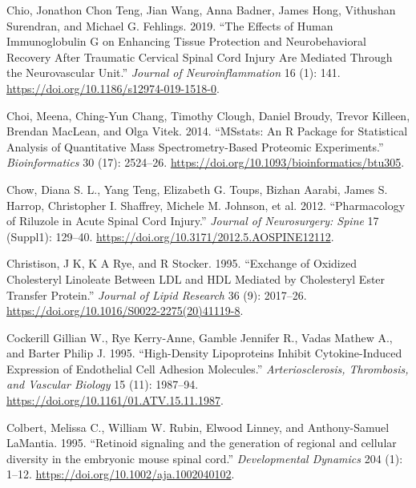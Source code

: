 \documentclass[9pt,lineno]{elife}
\newlength{\cslhangindent}
\newlength{\cslentryspacingunit} %
\newenvironment{CSLReferences}[2] %
 {%
  \setlength{\parindent}{0pt}
  \ifodd #1
  \let\oldpar\par
  \def\par{\hangindent=\cslhangindent\oldpar}
  \fi
  \setlength{\parskip}{#2\cslentryspacingunit}
 }%
 {}
\begin{document}
\begin{CSLReferences}{1}{0}
\leavevmode{}%
Chio, Jonathon Chon Teng, Jian Wang, Anna Badner, James Hong, Vithushan Surendran, and Michael G. Fehlings. 2019. {``The Effects of Human Immunoglobulin {G} on Enhancing Tissue Protection and Neurobehavioral Recovery After Traumatic Cervical Spinal Cord Injury Are Mediated Through the Neurovascular Unit.''} \emph{Journal of Neuroinflammation} 16 (1): 141. \url{https://doi.org/10.1186/s12974-019-1518-0}.

\leavevmode{}%
Choi, Meena, Ching-Yun Chang, Timothy Clough, Daniel Broudy, Trevor Killeen, Brendan MacLean, and Olga Vitek. 2014. {``{MSstats}: An {R} Package for Statistical Analysis of Quantitative Mass Spectrometry-Based Proteomic Experiments.''} \emph{Bioinformatics} 30 (17): 2524--26. \url{https://doi.org/10.1093/bioinformatics/btu305}.

\leavevmode{}%
Chow, Diana S. L., Yang Teng, Elizabeth G. Toups, Bizhan Aarabi, James S. Harrop, Christopher I. Shaffrey, Michele M. Johnson, et al. 2012. {``Pharmacology of Riluzole in Acute Spinal Cord Injury.''} \emph{Journal of Neurosurgery: Spine} 17 (Suppl1): 129--40. \url{https://doi.org/10.3171/2012.5.AOSPINE12112}.

\leavevmode{}%
Christison, J K, K A Rye, and R Stocker. 1995. {``Exchange of Oxidized Cholesteryl Linoleate Between {LDL} and {HDL} Mediated by Cholesteryl Ester Transfer Protein.''} \emph{Journal of Lipid Research} 36 (9): 2017--26. \url{https://doi.org/10.1016/S0022-2275(20)41119-8}.

\leavevmode{}%
Cockerill Gillian W., Rye Kerry-Anne, Gamble Jennifer R., Vadas Mathew A., and Barter Philip J. 1995. {``High-{Density Lipoproteins Inhibit Cytokine-Induced Expression} of {Endothelial Cell Adhesion Molecules}.''} \emph{Arteriosclerosis, Thrombosis, and Vascular Biology} 15 (11): 1987--94. \url{https://doi.org/10.1161/01.ATV.15.11.1987}.

\leavevmode{}%
Colbert, Melissa C., William W. Rubin, Elwood Linney, and Anthony-Samuel LaMantia. 1995. {``{Retinoid signaling and the generation of regional and cellular diversity in the embryonic mouse spinal cord}.''} \emph{Developmental Dynamics} 204 (1): 1--12. \url{https://doi.org/10.1002/aja.1002040102}.


\end{CSLReferences}
\end{document}

